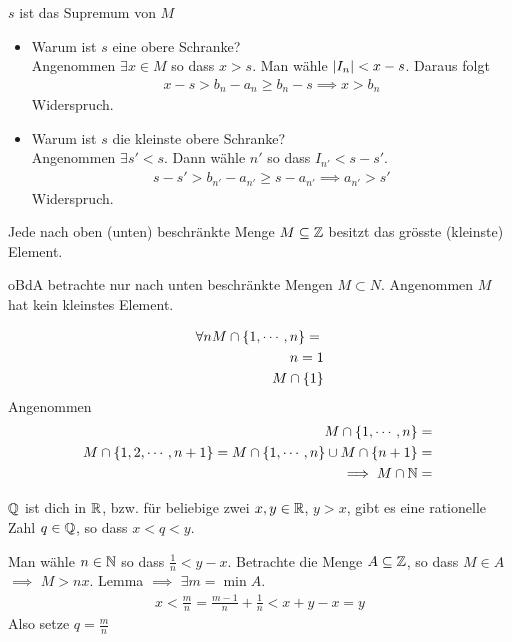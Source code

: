 \begin{Sat}
  $s$ ist das Supremum von $M$
  \begin{itemize}
    \item Warum ist $s$ eine obere Schranke? \\
    Angenommen $\exists x\in M$ so dass $x>s$. Man wähle $\mathopen| I_n \mathclose|<x-s$. Daraus folgt
    \begin{align*}
      x-s>b_n-a_n \geq b_n-s \implies x>b_n
    \end{align*}
    Widerspruch.
  \item Warum ist $s$ die kleinste obere Schranke?\\
    Angenommen $\exists s'<s$. Dann wähle $n'$ so dass $I_{n'} <s-s'$.
    \begin{align*}
      s-s'>b_{n'}-a_{n'}\geq s-a_{n'} \implies a_{n'}>s'
    \end{align*}
    Widerspruch.
  \end{itemize}
\end{Sat}
\begin{Lem}
  Jede nach oben (unten) beschränkte Menge $M\subseteq \mathbb{Z}$ besitzt das grösste (kleinste) Element.
\end{Lem}
\begin{Bew}
  oBdA betrachte nur nach unten beschränkte Mengen $M\subset N$. Angenommen $M$ hat kein kleinstes Element.
\end{Bew}
\begin{Sat}
  \begin{align*}
    \forall n M\cap \left\{ 1,\cdots,n \right\} = \null\\
    n=1\\
    M\cap\left\{ 1 \right\}\\
  \end{align*}
  Angenommen
  \begin{align*}
    M\cap\left\{ 1,\cdots,n \right\} = \null\\
    M\cap\left\{ 1,2,\cdots,n+1 \right\} = M\cap \left\{ 1,\cdots,n \right\}\cup M\cap\left\{ n+1 \right\}=\null\\
    \implies M\cap\mb{N}=\null
  \end{align*}
\end{Sat}
\begin{Sat}
  $\mathbb{Q}$ ist dich in $\mathbb{R}$, bzw. für beliebige zwei $x,y\in\mathbb{R}$, $y>x$, gibt es eine rationelle Zahl $q\in\mathbb{Q}$, so dass $x<q<y$.
\end{Sat}
\begin{Bew}
  Man wähle $n\in\mathbb{N}$ so dass $\frac{1}{n}<y-x$. Betrachte die Menge $A\subseteq\mathbb{Z}$, so dass $M\in A$ $\implies$ $M>nx$. Lemma $\implies$ $\exists m=\min A$.
  \begin{align*}
    x<\frac{m}{n}=\frac{m-1}{n}+\frac{1}{n}<x+y-x=y
  \end{align*}
  Also setze $q=\frac{m}{n}$
\end{Bew}
